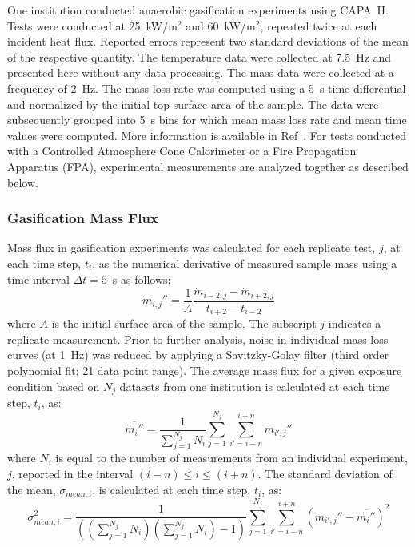 \documentclass{book}
\begin{document}
One institution conducted anaerobic gasification experiments using CAPA~II. Tests were conducted at 25~kW/m$^2$ and 60~kW/m$^2$, repeated twice at each incident heat flux. Reported errors represent two standard deviations of the mean of the respective quantity. The temperature data were collected at 7.5~Hz and presented here without any data processing. The mass data were collected at a frequency of 2~Hz. The mass loss rate was computed using a 5~s time differential and normalized by the initial top surface area of the sample. The data were subsequently grouped into 5~s bins for which mean mass loss rate and mean time values were computed. More information is available in Ref~\cite{fiola2020comparison}. For tests conducted with a Controlled Atmosphere Cone Calorimeter or a Fire Propagation Apparatus (FPA), experimental measurements are analyzed together as described below.

\subsubsection{Gasification Mass Flux}

Mass flux in gasification experiments was calculated for each replicate test, $j$, at each time step, $t_i$, as the numerical derivative of measured sample mass using a time interval $\Delta t=5$~s as follows:
\begin{equation}
   \dot{m}_{i,j}'' = \frac{1}{A} \frac{\dot{m}_{i-2,j}-\dot{m}_{i+2,j}}{t_{i+2}-t_{i-2}}
\end{equation}
where $A$ is the initial surface area of the sample. The subscript $j$ indicates a replicate measurement. Prior to further analysis, noise in individual mass loss curves (at 1~Hz) was reduced by applying a Savitzky-Golay filter (third order polynomial fit; 21 data point range). The average mass flux for a given exposure condition based on $N_j$ datasets from one institution is calculated at each time step, $t_i$, as:
\begin{equation}
   \overline{\dot{m}_i''} = \frac{1}{\sum_{j=1}^{N_j}{N_i}} \sum_{j=1}^{N_j} \sum_{i'=i-n}^{i+n} \dot{m}_{i',j}''
\end{equation}
where $N_i$ is equal to the number of measurements from an individual experiment, $j$, reported in the interval $(i-n) \leq i \leq (i+n)$. The standard deviation of the mean, $\sigma_{mean,i}$, is calculated at each time step, $t_i$, as:
\begin{equation}
   \sigma_{mean,i}^2 = \frac{1}{(({\sum_{j=1}^{N_j}{N_i}})({\sum_{j=1}^{N_j}{N_i}})-1)} \sum_{j=1}^{N_j} \sum_{i'=i-n}^{i+n} \left( \dot{m}_{i',j}'' - \overline{\dot{m}_i''} \right)^2
\end{equation}
\end{document}
